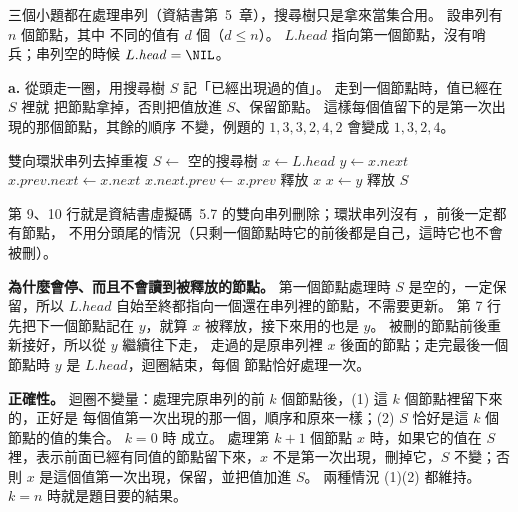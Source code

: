 \begin{pastsoln}
三個小題都在處理串列（資結書第~5~章），搜尋樹只是拿來當集合用。 設串列有 $n$ 個節點，其中
不同的值有 $d$ 個（$d \le n$）。 $L.\mathit{head}$ 指向第一個節點，沒有哨兵；串列空的時候
$L.\mathit{head} = \NIL$。

\textbf{a.} 從頭走一圈，用搜尋樹 $S$ 記「已經出現過的值」。 走到一個節點時，值已經在 $S$ 裡就
把節點拿掉，否則把值放進 $S$、保留節點。 這樣每個值留下的是第一次出現的那個節點，其餘的順序
不變，例題的 $1, 3, 3, 2, 4, 2$ 會變成 $1, 3, 2, 4$。

\begin{pseudo}{雙向環狀串列去掉重複}
        \State \Return
    \EndIf
    \State $S \gets$ 空的搜尋樹
    \State $x \gets L.\mathit{head}$
    \Repeat
        \State $y \gets x.\mathit{next}$ 
         
            \State $x.\mathit{prev}.\mathit{next} \gets x.\mathit{next}$
            \State $x.\mathit{next}.\mathit{prev} \gets x.\mathit{prev}$
            \State 釋放 $x$
        \Else
            \State {}
        \EndIf
        \State $x \gets y$
    \State 釋放 $S$
\EndProcedure
\end{pseudo}

第 9、10 行就是資結書虛擬碼~5.7 的雙向串列刪除；環狀串列沒有 \NIL，前後一定都有節點，
不用分頭尾的情況（只剩一個節點時它的前後都是自己，這時它也不會被刪）。

\textbf{為什麼會停、而且不會讀到被釋放的節點。} 第一個節點處理時 $S$ 是空的，一定保留，所以
$L.\mathit{head}$ 自始至終都指向一個還在串列裡的節點，不需要更新。 第 7 行先把下一個節點記在
$y$，就算 $x$ 被釋放，接下來用的也是 $y$。 被刪的節點前後重新接好，所以從 $y$ 繼續往下走，
走過的是原串列裡 $x$ 後面的節點；走完最後一個節點時 $y$ 是 $L.\mathit{head}$，迴圈結束，每個
節點恰好處理一次。

\textbf{正確性。} 迴圈不變量：處理完原串列的前 $k$ 個節點後，(1) 這 $k$ 個節點裡留下來的，正好是
每個值第一次出現的那一個，順序和原來一樣；(2) $S$ 恰好是這 $k$ 個節點的值的集合。 $k = 0$ 時
成立。 處理第 $k+1$ 個節點 $x$ 時，如果它的值在 $S$ 裡，表示前面已經有同值的節點留下來，$x$
不是第一次出現，刪掉它，$S$ 不變；否則 $x$ 是這個值第一次出現，保留，並把值加進 $S$。 兩種情況
(1)(2) 都維持。 $k = n$ 時就是題目要的結果。


\end{pastsoln}
